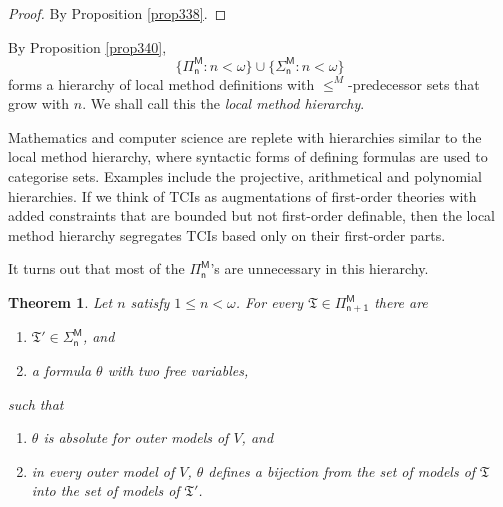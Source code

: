 \documentclass[12pt, twoside]{memoir}
\numberwithin{equation}{section}
\newtheorem{thm}{Theorem}[section]
\theoremstyle{definition}
\theoremstyle{remark}
\theoremstyle{definition}
\theoremstyle{definition}
\theoremstyle{definition}
\theoremstyle{remark}
\begin{document}
\begin{proof}
By Proposition \ref{prop338}.
\end{proof}

By Proposition \ref{prop340}, 
\begin{equation*}
    \{\mathsf{\Pi^M_n} : n < \omega\} \cup \{\mathsf{\Sigma^M_n} : n < \omega\}
\end{equation*}
forms a hierarchy of local method definitions with $\leq^M$-predecessor sets that grow with $n$. We shall call this the \emph{local method hierarchy}.

Mathematics and computer science are replete with hierarchies similar to the local method hierarchy, where syntactic forms of defining formulas are used to categorise sets. Examples include the projective, arithmetical and polynomial hierarchies. If we think of TCIs as augmentations of first-order theories with added constraints that are bounded but not first-order definable, then the local method hierarchy segregates TCIs based only on their first-order parts.

It turns out that most of the $\mathsf{\Pi^M_n}$'s are unnecessary in this hierarchy. 

\begin{thm}\label{prop252'}
Let $n$ satisfy $1 \leq n < \omega$. For every $\mathfrak{T} \in \mathsf{\Pi^M_{n+1}}$ there are
\begin{enumerate}[label=(\arabic*)]
    \item $\mathfrak{T}' \in \mathsf{\Sigma^M_n}$, and
    \item a formula $\theta$ with two free variables,
\end{enumerate}
such that 
\begin{enumerate}[label=(\alph*)]
    \item $\theta$ is absolute for outer models of $V$, and
    \item in every outer model of $V$, $\theta$ defines a bijection from the set of models of $\mathfrak{T}$ into the set of models of $\mathfrak{T}'$.
\end{enumerate}
\end{thm}
\end{document}
